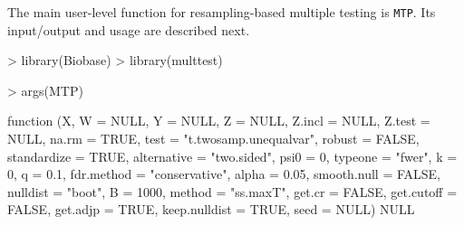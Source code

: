 \documentclass[11pt]{article}
\newcommand{\Robject}[1]{\texttt{#1}}
\begin{document}
The main user-level function for resampling-based multiple testing is \Robject{MTP}. Its input/output and usage are described next. 

\begin{Schunk}
\begin{Sinput}
> library(Biobase)
> library(multtest)
\end{Sinput}
\end{Schunk}

\begin{Schunk}
\begin{Sinput}
> args(MTP)
\end{Sinput}
\begin{Soutput}
function (X, W = NULL, Y = NULL, Z = NULL, Z.incl = NULL, Z.test = NULL, 
    na.rm = TRUE, test = "t.twosamp.unequalvar", robust = FALSE, 
    standardize = TRUE, alternative = "two.sided", psi0 = 0, 
    typeone = "fwer", k = 0, q = 0.1, fdr.method = "conservative", 
    alpha = 0.05, smooth.null = FALSE, nulldist = "boot", B = 1000, 
    method = "ss.maxT", get.cr = FALSE, get.cutoff = FALSE, get.adjp = TRUE, 
    keep.nulldist = TRUE, seed = NULL) 
NULL
\end{Soutput}
\end{Schunk}
\end{document}
